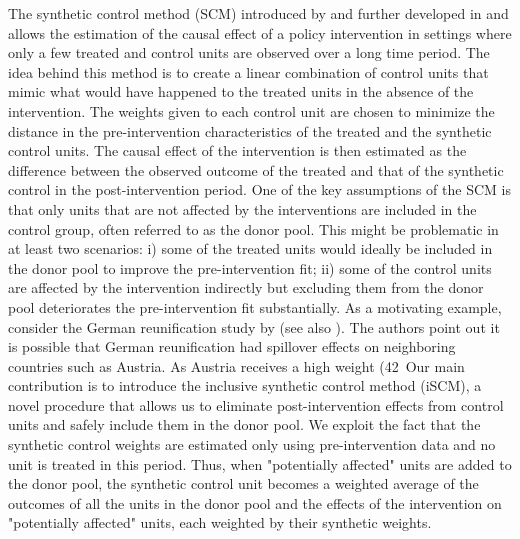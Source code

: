 The synthetic control method (SCM) introduced by \cite{Aba2003} and further developed in \cite{Aba2010} and \cite{Aba2015} allows the estimation of the causal effect of a policy intervention in settings where only a few treated and control units are observed over a long time period. The idea behind this method is to create a linear combination of control units that mimic what would have happened to the treated units in the absence of the intervention. The weights given to each control unit are chosen to minimize the distance in the pre-intervention characteristics of the treated and the synthetic control units. The causal effect of the intervention is then estimated as the difference between the observed outcome of the treated and that of the synthetic control in the post-intervention period. 
One of the key assumptions of the SCM is that only units that are not affected by the interventions are included in the control group, often referred to as the donor pool. 
This might be problematic in at least two scenarios: i) some of the treated units would ideally be included in the donor pool to improve the pre-intervention fit; ii) some of the control units are affected by the intervention indirectly but excluding them from the donor pool deteriorates the pre-intervention fit substantially. As a motivating example, consider the German reunification study by \cite{Aba2015} (see also \cite{Aba2020}). The authors point out it is possible that German reunification had spillover effects on neighboring countries such as Austria. As Austria receives a high weight (42\
Our main contribution is to introduce the inclusive synthetic control method (iSCM), a novel procedure that allows us to eliminate post-intervention effects from control units and safely include them in the donor pool. We exploit the fact that the synthetic control weights are estimated only using pre-intervention data and no unit is treated in this period. Thus, when "potentially affected" units are added to the donor pool, the synthetic control unit becomes a weighted average of the outcomes of all the units in the donor pool and the effects of the intervention on "potentially affected" units, each weighted by their synthetic weights.
